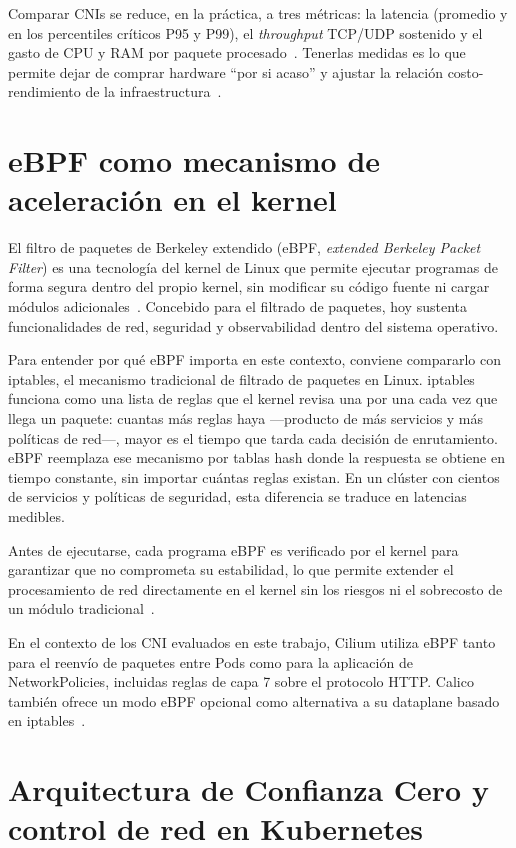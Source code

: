 Comparar CNIs se reduce, en la práctica, a tres métricas: la latencia (promedio y en los percentiles críticos P95 y P99), el \emph{throughput} TCP/UDP sostenido y el gasto de CPU y RAM por paquete procesado~\cite{ref7,ref8}. Tenerlas medidas es lo que permite dejar de comprar hardware ``por si acaso'' y ajustar la relación costo-rendimiento de la infraestructura~\cite{ref7,ref8,ref12,ref23,ref24,ref25}.

\section{eBPF como mecanismo de aceleración en el kernel}

El filtro de paquetes de Berkeley extendido (eBPF, \emph{extended Berkeley Packet Filter}) es una tecnología del kernel de Linux que permite ejecutar programas de forma segura dentro del propio kernel, sin modificar su código fuente ni cargar módulos adicionales~\cite{ref27}. Concebido para el filtrado de paquetes, hoy sustenta funcionalidades de red, seguridad y observabilidad dentro del sistema operativo.

Para entender por qué eBPF importa en este contexto, conviene compararlo con iptables, el mecanismo tradicional de filtrado de paquetes en Linux. iptables funciona como una lista de reglas que el kernel revisa una por una cada vez que llega un paquete: cuantas más reglas haya ---producto de más servicios y más políticas de red---, mayor es el tiempo que tarda cada decisión de enrutamiento. eBPF reemplaza ese mecanismo por tablas hash donde la respuesta se obtiene en tiempo constante, sin importar cuántas reglas existan. En un clúster con cientos de servicios y políticas de seguridad, esta diferencia se traduce en latencias medibles.

Antes de ejecutarse, cada programa eBPF es verificado por el kernel para garantizar que no comprometa su estabilidad, lo que permite extender el procesamiento de red directamente en el kernel sin los riesgos ni el sobrecosto de un módulo tradicional~\cite{ref27}.

En el contexto de los CNI evaluados en este trabajo, Cilium utiliza eBPF tanto para el reenvío de paquetes entre Pods como para la aplicación de NetworkPolicies, incluidas reglas de capa 7 sobre el protocolo HTTP. Calico también ofrece un modo eBPF opcional como alternativa a su dataplane basado en iptables~\cite{ref12}.

\section{Arquitectura de Confianza Cero y control de red en Kubernetes}

